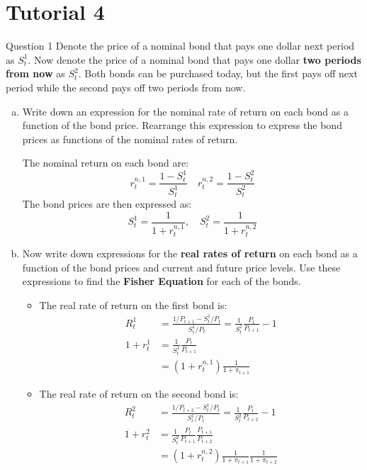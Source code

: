 \documentclass[a4paper]{article}
\newif\IfInSansMode
\begin{document}
\section{Tutorial 4}
	\begin{questionbox}{Question 1}
		Denote the price of a nominal bond that pays one dollar next period as \( S_t^1 \). Now denote the price of a nominal bond that pays one dollar \textbf{two periods from now} as \( S_t^2 \). Both bonds can be purchased today, but the first pays off next period while the second pays off two periods from now.
		\begin{enumerate}[(a)]
			\item Write down an expression for the nominal rate of return on each bond as a function of the bond price. Rearrange this expression to express the bond prices as functions of the nominal rates of return.
			\begin{explanationbox}
				The nominal return on each bond are:
				\[
					r_t^{n,1} = \frac{1-S_t^1}{S_t^1} \quad r_t^{n,2} = \frac{1-S_t^2}{S_t^2}
				\]
				The bond prices are then expressed as:
				\[
					S_t^1 = \frac{1}{1 + r_t^{n,1}}, \quad S_t^2 = \frac{1}{1 + r_t^{n,2}}
				\]
			\end{explanationbox}
			\item Now write down expressions for the \textbf{real rates of return} on each bond as a function of the bond prices and current and future price levels. Use these expressions to find the \textbf{Fisher Equation} for each of the bonds.
			\begin{explanationbox}
				\begin{itemize}
					\item The real rate of return on the first bond is:
					\begin{align*}
						R_t^1 &= \frac{1/P_{t+1}-S_t^1/P_t}{S_t^1/P_t} = \frac{1}{S_t^1}\frac{P_t}{P_{t+1}} - 1\\
						1 + r_t^1 &= \frac{1}{S_t^1}\frac{P_t}{P_{t+1}}\\
						&= (1+r_t^{n,1}) \frac{1}{1+\pi_{t+1}}
					\end{align*}
					\item The real rate of return on the second bond is:
					\begin{align*}
						R_t^2 &= \frac{1/P_{t+2}-S_t^1/P_t}{S_t^1/P_t} = \frac{1}{S_t^2}\frac{P_t}{P_{t+2}} - 1\\
						1 + r_t^2 &= \frac{1}{S_t^2}\frac{P_t}{P_{t+1}}\frac{P_{t+1}}{P_{t+2}}\\
						&= (1+r_t^{n,2}) \frac{1}{1+\pi_{t+1}} \frac{1}{1+\pi_{t+2}}

\end{align*}
\end{itemize}
\end{explanationbox}
\end{enumerate}
\end{questionbox}
\end{document}
